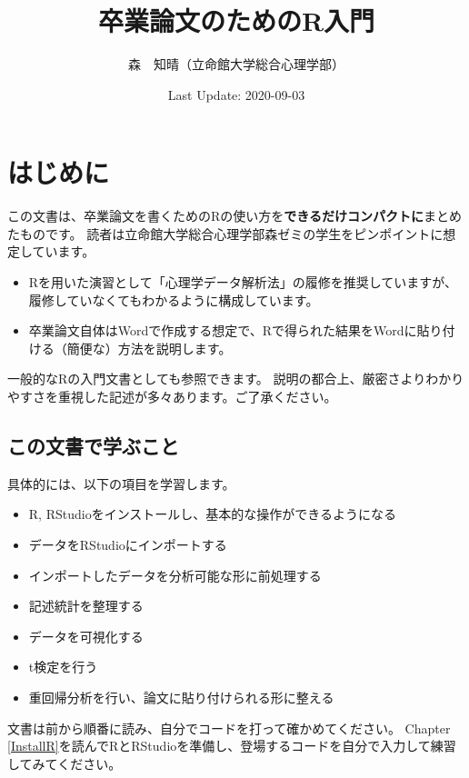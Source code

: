 \documentclass[]{book}
\title{卒業論文のためのR入門}
\author{森　知晴（立命館大学総合心理学部）}
\date{Last Update: 2020-09-03}
\providecommand{\tightlist}{%
  \setlength{\itemsep}{0pt}\setlength{\parskip}{0pt}}
\begin{document}
\maketitle

{
\setcounter{tocdepth}{1}
\tableofcontents
}
\chapter{はじめに}\label{Introduction}

この文書は、卒業論文を書くためのRの使い方を\textbf{できるだけコンパクトに}まとめたものです。
読者は立命館大学総合心理学部森ゼミの学生をピンポイントに想定しています。

\begin{itemize}
\tightlist
\item
  Rを用いた演習として「心理学データ解析法」の履修を推奨していますが、履修していなくてもわかるように構成しています。
\item
  卒業論文自体はWordで作成する想定で、Rで得られた結果をWordに貼り付ける（簡便な）方法を説明します。
\end{itemize}

一般的なRの入門文書としても参照できます。
説明の都合上、厳密さよりわかりやすさを重視した記述が多々あります。ご了承ください。

\section{この文書で学ぶこと}\label{ux3053ux306eux6587ux66f8ux3067ux5b66ux3076ux3053ux3068}

具体的には、以下の項目を学習します。

\begin{itemize}
\tightlist
\item
  R, RStudioをインストールし、基本的な操作ができるようになる
\item
  データをRStudioにインポートする
\item
  インポートしたデータを分析可能な形に前処理する
\item
  記述統計を整理する
\item
  データを可視化する
\item
  t検定を行う
\item
  重回帰分析を行い、論文に貼り付けられる形に整える
\end{itemize}

文書は前から順番に読み、自分でコードを打って確かめてください。 Chapter
\ref{InstallR}を読んでRとRStudioを準備し、登場するコードを自分で入力して練習してみてください。
\end{document}
